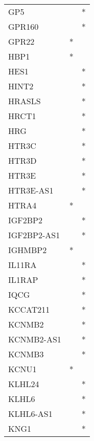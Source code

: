 \begin{longtable}{lcc}
GP5              &                &          * \\
GPR160           &                &          * \\
GPR22            &              * &            \\
HBP1             &              * &            \\
HES1             &                &          * \\
HINT2            &                &          * \\
HRASLS           &                &          * \\
HRCT1            &                &          * \\
HRG              &                &          * \\
HTR3C            &                &          * \\
HTR3D            &                &          * \\
HTR3E            &                &          * \\
HTR3E-AS1        &                &          * \\
HTRA4            &              * &            \\
IGF2BP2          &                &          * \\
IGF2BP2-AS1      &                &          * \\
IGHMBP2          &              * &            \\
IL11RA           &                &          * \\
IL1RAP           &                &          * \\
IQCG             &                &          * \\
KCCAT211         &                &          * \\
KCNMB2           &                &          * \\
KCNMB2-AS1       &                &          * \\
KCNMB3           &                &          * \\
KCNU1            &              * &            \\
KLHL24           &                &          * \\
KLHL6            &                &          * \\
KLHL6-AS1        &                &          * \\
KNG1             &                &          * \\

\end{longtable}
